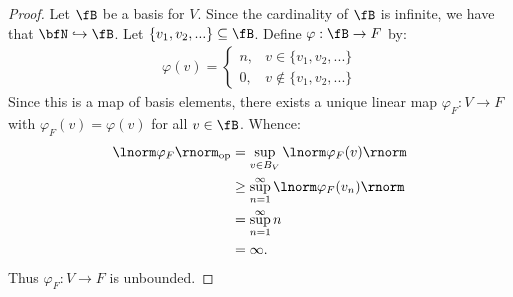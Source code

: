 \documentclass[11pt,twoside,openany]{memoir}
\begin{document}
        \begin{proof}
            Let $\fB$ be a basis for $V$. Since the cardinality of $\fB$ is infinite, we have that $\bfN \hookrightarrow \fB$. Let $\{v_1,v_2,...\} \subseteq \fB$. Define $\varphi:\fB \rightarrow F$ by: 
                \begin{equation*}
                \begin{split}
                    \varphi(v) = \begin{cases}
                        n,& v \in \{v_1,v_2,...\} \\ 0, & v \not\in \{v_1,v_2,...\}
                    \end{cases}
                \end{split}
                \end{equation*}
            Since this is a map of basis elements, there exists a unique linear map $\varphi_F: V \rightarrow F$ with $\varphi_F(v) = \varphi(v)$ for all $v \in \fB$. Whence:
                \begin{equation*}
                \begin{split}
                    \lnorm \varphi_F \rnorm_\text{op}
                    & = \sup_{v \in B_V}\lnorm \varphi_F(v) \rnorm \\
                    & \geq \sup_{n = 1}^\infty \lnorm \varphi_F(v_n) \rnorm \\
                    & = \sup_{n = 1}^\infty n \\
                    & = \infty.
                \end{split}
                \end{equation*}
            Thus $\varphi_F:V \rightarrow F$ is unbounded.
        \end{proof}
\end{document}
